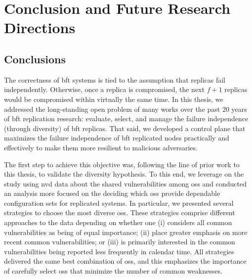 \chapter{Conclusion and Future Research Directions}
\label{chap:conclusion}

\section{Conclusions}
The correctness of \gls{bft} systems is tied to the assumption that replicas fail independently. 
Otherwise, once a replica is compromised, the next $f+1$ replicas would be compromised within virtually the same time.
In this thesis, we addressed the long-standing open problem of many works over the past 20 years of \gls{bft} replication research: evaluate, select, and manage the failure independence (through diversity) of \gls{bft} replicas.
That said, we developed a control plane that maximizes the failure independence of \gls{bft} replicated nodes practically and effectively to make them more resilient to malicious adversaries.


The first step to achieve this objective was, following the line of prior work to this thesis, to validate the diversity hypothesis.  
To this end, we leverage on the study using \gls{nvd} data about the shared vulnerabilities among \glspl{os} and conducted an analysis more focused on the deciding which \glspl{os} provide dependable configuration sets for replicated systems.
In particular, we presented several strategies to choose the most diverse \glspl{os}.
These strategies comprise different approaches to the data depending on whether one (i) considers all common vulnerabilities as being of equal importance; (ii) place greater emphasis on more recent common vulnerabilities; or (iii) is primarily interested in the common vulnerabilities being reported less frequently in calendar time.
All strategies delivered the same best combination of \glspl{os}, and this emphasizes the importance of carefully select \glspl{os} that minimize the number of common weaknesses.


